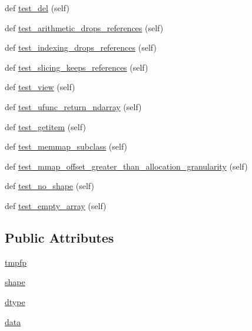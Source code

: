 \begin{DoxyCompactItemize}
\item 
def \hyperlink{classnumpy_1_1core_1_1tests_1_1test__memmap_1_1TestMemmap_a18bb68797c78d4f88be30c95b6483316}{test\+\_\+del} (self)
\item 
def \hyperlink{classnumpy_1_1core_1_1tests_1_1test__memmap_1_1TestMemmap_abca71f2cc7d024d1b17ce1d7b82b15c8}{test\+\_\+arithmetic\+\_\+drops\+\_\+references} (self)
\item 
def \hyperlink{classnumpy_1_1core_1_1tests_1_1test__memmap_1_1TestMemmap_afb7a4edcedab7a4436e73ed7cadc77a9}{test\+\_\+indexing\+\_\+drops\+\_\+references} (self)
\item 
def \hyperlink{classnumpy_1_1core_1_1tests_1_1test__memmap_1_1TestMemmap_acc1963c08eaddd29efcef87ffbb97107}{test\+\_\+slicing\+\_\+keeps\+\_\+references} (self)
\item 
def \hyperlink{classnumpy_1_1core_1_1tests_1_1test__memmap_1_1TestMemmap_a815769ce3fc9cd01fc6a934038b9a01a}{test\+\_\+view} (self)
\item 
def \hyperlink{classnumpy_1_1core_1_1tests_1_1test__memmap_1_1TestMemmap_a8955d3927e1e3acd52bf572fe3fe43cc}{test\+\_\+ufunc\+\_\+return\+\_\+ndarray} (self)
\item 
def \hyperlink{classnumpy_1_1core_1_1tests_1_1test__memmap_1_1TestMemmap_a5fd67a65c8f41ba3eda5efa2144ae66e}{test\+\_\+getitem} (self)
\item 
def \hyperlink{classnumpy_1_1core_1_1tests_1_1test__memmap_1_1TestMemmap_a9066af0813736636e7444f39b560c2fc}{test\+\_\+memmap\+\_\+subclass} (self)
\item 
def \hyperlink{classnumpy_1_1core_1_1tests_1_1test__memmap_1_1TestMemmap_aa2afe191e99a2afe1e84ac3e86779bba}{test\+\_\+mmap\+\_\+offset\+\_\+greater\+\_\+than\+\_\+allocation\+\_\+granularity} (self)
\item 
def \hyperlink{classnumpy_1_1core_1_1tests_1_1test__memmap_1_1TestMemmap_ac506ef488c65392d761b799ee48b7936}{test\+\_\+no\+\_\+shape} (self)
\item 
def \hyperlink{classnumpy_1_1core_1_1tests_1_1test__memmap_1_1TestMemmap_a886cfffdb2f99e61028a87bd8b62f208}{test\+\_\+empty\+\_\+array} (self)
\end{DoxyCompactItemize}
\subsection*{Public Attributes}
\begin{DoxyCompactItemize}
\item 
\hyperlink{classnumpy_1_1core_1_1tests_1_1test__memmap_1_1TestMemmap_a1a394ab8ef30a856fdd2c24226cf0789}{tmpfp}
\item 
\hyperlink{classnumpy_1_1core_1_1tests_1_1test__memmap_1_1TestMemmap_a312bf0436cabc3d2eeb8d02914fbb204}{shape}
\item 
\hyperlink{classnumpy_1_1core_1_1tests_1_1test__memmap_1_1TestMemmap_a644927bfcd5a55abf0ad0736cc9b56c6}{dtype}
\item 
\hyperlink{classnumpy_1_1core_1_1tests_1_1test__memmap_1_1TestMemmap_a6e4fd49f8d4a8e9cce32d052d811d1d8}{data}
\end{DoxyCompactItemize}
